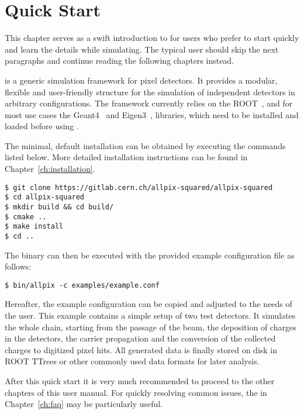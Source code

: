 \chapter{Quick Start}
\label{ch:quickstart}
This chapter serves as a swift introduction to \apsq for users who prefer to start quickly and learn the details while simulating.
The typical user should skip the next paragraphs and continue reading the following chapters instead.

\apsq is a generic simulation framework for pixel detectors.
It provides a modular, flexible and user-friendly structure for the simulation of independent detectors in arbitrary configurations.
The framework currently relies on the ROOT~\cite{root}, and for most use cases the Geant4~\cite{geant4} and Eigen3~\cite{eigen3}, libraries, which need to be installed and loaded before using \apsq.

The minimal, default installation can be obtained by executing the commands listed below.
More detailed installation instructions can be found in Chapter~\ref{ch:installation}.

\begin{verbatim}
$ git clone https://gitlab.cern.ch/allpix-squared/allpix-squared
$ cd allpix-squared
$ mkdir build && cd build/
$ cmake ..
$ make install
$ cd ..
\end{verbatim}
The binary can then be executed with the provided example configuration file as follows:
\begin{verbatim}
$ bin/allpix -c examples/example.conf
\end{verbatim}

Hereafter, the example configuration can be copied and adjusted to the needs of the user.
This example contains a simple setup of two test detectors.
It simulates the whole chain, starting from the passage of the beam, the deposition of charges in the detectors, the carrier propagation and the conversion of the collected charges to digitized pixel hits.
All generated data is finally stored on disk in ROOT TTrees or other commonly used data formats for later analysis.

After this quick start it is very much recommended to proceed to the other chapters of this user manual.
For quickly resolving common issues, the  in Chapter~\ref{ch:faq} may be particularly useful.
